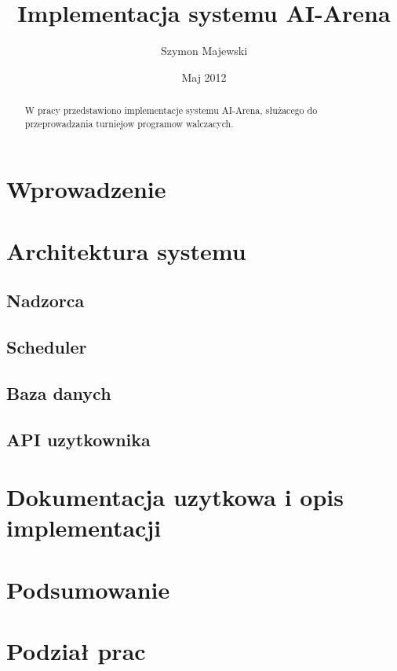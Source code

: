 \documentclass[licencjacka]{pracamgr}
\author{Szymon Majewski}
\title{Implementacja systemu AI-Arena}
\date{Maj 2012}
\begin{document}
\maketitle

\begin{abstract}
W pracy przedstawiono implementacje systemu AI-Arena,
 s{\l}u{\.z}acego do przeprowadzania turniejow programow walczacych.
\end{abstract}

\tableofcontents

\chapter*{Wprowadzenie}

\chapter{Architektura systemu}

\section{Nadzorca}

\section{Scheduler}

\section{Baza danych}

\section{API uzytkownika}


\chapter{Dokumentacja uzytkowa i opis implementacji}

\chapter{Podsumowanie}

\chapter{Podzia{\l} prac}
\end{document}
